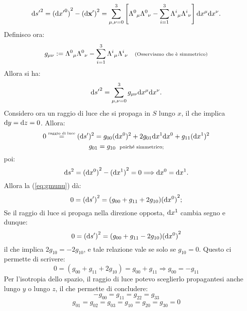 \begin{dimostrazione}
\begin{displaymath}
    \mathrm{d} {s'}^{ 2 } = {(\mathrm{d} {x'}^{ 0 })}^2 - {( \mathrm{d} {\mathbf{ x }}'
      )}^2 = \sum_{ \mu,\nu = 0}^{ 3 } \left[ \Lambda^0 {}_{\mu} \Lambda^0
      {}_{\nu} - \sum_{i = 1}^{ 3 } \Lambda^i {}_{\mu} \Lambda^i {}_{\nu}
    \right] \mathrm{d} x^{ \mu } \mathrm{d} x^{ \nu }.
  \end{displaymath}
  Definisco ora:
  \begin{displaymath}
    g_{ \mu \nu } := \Lambda^0 {}_{\mu} \Lambda^0 {}_{\nu} -
    \sum_{i = 1}^{ 3 } \Lambda^i {}_{\mu} \Lambda^i {}_{\nu} \quad
    \mbox{\scriptsize (Osserviamo che \`e simmetrico)}
  \end{displaymath}
  Allora si ha:
  \begin{displaymath}
    \mathrm{d} {s'}^{ 2 }= \sum_{ \mu,\nu = 0 }^{3} g_{\mu \nu} \mathrm{d} x^{\mu}
    \mathrm{d} x^{\nu}.
  \end{displaymath}
  Considero ora un raggio di luce che si propaga in $S$ lungo $x$, il
  che implica $ \mathrm{d} y = \mathrm{d} z = 0 $. Allora:
  \begin{equation}
    0 \stackrel{\mathrm{\scriptscriptstyle raggio \;di\; luce}}{=} (\mathrm{d}
    {s'})^2 = g_{00} (\mathrm{d} x^0)^2 + 2 g_{01} \mathrm{d} x^1 \mathrm{d} x^0 + g_{11}
    (\mathrm{d} x^1)^2 
    \label{eq:gmunu}
  \end{equation}
  \begin{displaymath}
    g_{01}=g_{10} \;\;\mbox{\scriptsize poich\'e simmetrico;}
  \end{displaymath}
  poi:
  \begin{displaymath}
    {\mathrm{d}s}^2 = {(\mathrm{d} x^0)}^2 - {(\mathrm{d} x^1)}^2 = 0 \Longrightarrow \mathrm{d}
    x^0 = \mathrm{d} x^1.
  \end{displaymath}
  Allora la (\ref{eq:gmunu}) d\`a:
  \begin{equation}
    0 = {(\mathrm{d} s')}^2 = (g_{00} + g_{11} + 2 g_{10}){(\mathrm{d} x^0)}^2;
  \end{equation}
  Se il raggio di luce si propaga nella direzione opposta, $\mathrm{d} x^1$
  cambia segno e dunque:
  \begin{displaymath}
    0 = {(\mathrm{d} s')}^2 = (g_{00} + g_{11} - 2 g_{10}){(\mathrm{d} x^0)}^2
  \end{displaymath}
  il che implica $ 2 g_{10} = -2 g_{10}$, e tale relazione vale se
  solo se $ g_{10} = 0$. Questo ci permette di scrivere:
  \begin{displaymath}
    0 = (g_{00} + g_{11} + 2 g_{10}) = g_{00} + g_{11} \Longrightarrow
    g_{00} = - g_{11}
  \end{displaymath}
  Per l'isotropia dello spazio, il raggio di luce potevo sceglierlo
  propagantesi anche lungo $y$ o lungo $z$, il che permette di
  concludere:
  \begin{displaymath}
    - g_{00} = g_{11} = g_{22} = g_{33}
  \end{displaymath}
  \begin{displaymath}
    g_{01} = g_{02} = g_{03} = g_{10} = g_{20} =g_{30} = 0
  \end{displaymath}


\end{dimostrazione}
